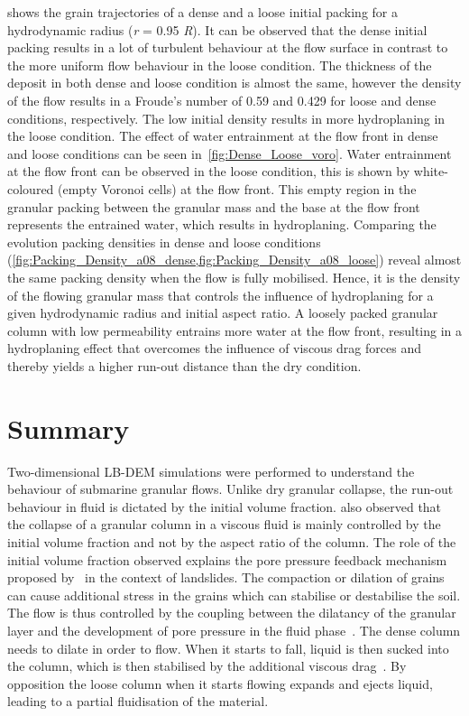 \documentclass[12pt,a4paper,twocolumn,fleqn]{narms}
\begin{document}
 shows the grain trajectories of a dense and a loose 
initial packing for a hydrodynamic radius (\textit{r} = 0.95 \textit{R}). It 
can be observed that 
the dense initial packing results in a lot of turbulent behaviour at the flow 
surface in contrast to the more uniform flow behaviour in the loose condition. 
The thickness of the deposit in both dense and loose condition is almost the 
same, however the density of the flow results in a Froude's number of 0.59 and
0.429 for loose and dense conditions, respectively. The low initial density 
results in more hydroplaning in the loose condition. The effect of water 
entrainment at the flow front in dense and loose conditions can be seen 
in~\cref{fig:Dense_Loose_voro}. Water entrainment at the flow front can be 
observed in the loose condition, this is shown by white-coloured (empty Voronoi 
cells) at the flow front. This empty region in the granular packing between the 
granular mass and the base at the flow front represents the entrained water, 
which results in hydroplaning. Comparing the evolution packing densities in 
dense and loose conditions
(\cref{fig:Packing_Density_a08_dense,fig:Packing_Density_a08_loose}) 
reveal almost the same packing density when the flow is fully mobilised. Hence, 
it is the density of the flowing granular mass that controls the influence of 
hydroplaning for a given hydrodynamic radius and initial aspect ratio. A 
loosely packed granular column with low permeability entrains 
more water at the flow front, resulting in a hydroplaning effect that overcomes 
the influence of viscous drag forces and thereby yields a higher run-out 
distance than the dry condition.

\section{Summary}

Two-dimensional LB-DEM simulations were performed to understand the behaviour of
submarine granular flows. Unlike dry granular collapse, the run-out behaviour in
fluid is dictated by the initial volume fraction.
 also observed that the collapse of a granular column in a 
viscous fluid is mainly controlled by the initial volume fraction and not by 
the aspect ratio of the column. The role of the initial volume fraction 
observed explains the pore pressure feedback mechanism proposed 
by~ in the context of landslides. The 
compaction or dilation of grains can cause additional stress in the grains 
which can stabilise or destabilise the soil. The flow is thus controlled by the 
coupling between the dilatancy of the granular layer and the development of 
pore pressure in the fluid phase~. The dense column needs to 
dilate in order to flow. When it starts to fall, liquid is then sucked into the 
column, which is then stabilised by the additional viscous 
drag~. By opposition the loose column when 
it starts flowing expands and ejects liquid, leading to a partial fluidisation 
of the material.
\end{document}
